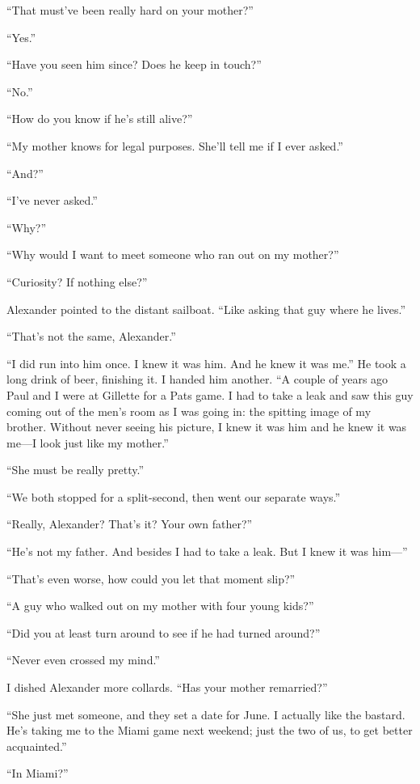 ``That must've been really hard on your mother?''

``Yes.''

``Have you seen him since? Does he keep in touch?''

``No.''

``How do you know if he's still alive?''

``My mother knows for legal purposes. She'll tell me if I ever asked.''

``And?''

``I've never asked.''

``Why?''

``Why would I want to meet someone who ran out on my mother?''

``Curiosity? If nothing else?''

Alexander pointed to the distant sailboat. ``Like asking that guy where
he lives.''

``That's not the same, Alexander.''

``I did run into him once. I knew it was him. And he knew it was me.''
He took a long drink of beer, finishing it. I handed him another. ``A
couple of years ago Paul and I were at Gillette for a Pats game. I had
to take a leak and saw this guy coming out of the men's room as I was
going in: the spitting image of my brother. Without never seeing his
picture, I knew it was him and he knew it was me---I look just like my
mother.''

``She must be really pretty.''

``We both stopped for a split-second, then went our separate ways.''

``Really, Alexander? That's it? Your own father?''

``He's not my father. And besides I had to take a leak. But I knew it
was him---''

``That's even worse, how could you let that moment slip?''

``A guy who walked out on my mother with four young kids?''

``Did you at least turn around to see if he had turned around?''

``Never even crossed my mind.''

I dished Alexander more collards. ``Has your mother remarried?''

``She just met someone, and they set a date for June. I actually like
the bastard. He's taking me to the Miami game next weekend; just the two
of us, to get better acquainted.''

``In Miami?''

